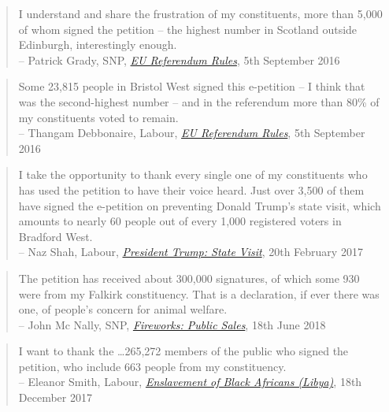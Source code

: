 \documentclass[12pt]{article}
\begin{document}
\begin{quote}
I understand and share the frustration of my constituents, more than 5,000 of whom signed the petition -- the highest number in Scotland outside Edinburgh, interestingly enough. \\ 
-- Patrick Grady, SNP, \href{https://hansard.parliament.uk/commons/2016-09-05/debates/D2FA95BF-6E07-497D-83A4-0B7341384289/EUReferendumRules}{\emph{EU Referendum Rules}}, 5th September 2016
\end{quote}

\begin{quote}
Some 23,815 people in Bristol West signed this e-petition -- I think that was the second-highest number -- and in the referendum more than 80\% of my constituents voted to remain. \\ 
-- Thangam Debbonaire, Labour, \href{https://hansard.parliament.uk/commons/2016-09-05/debates/D2FA95BF-6E07-497D-83A4-0B7341384289/EUReferendumRules}{\emph{EU Referendum Rules}}, 5th September 2016
\end{quote}

\begin{quote}
I take the opportunity to thank every single one of my constituents who has used the petition to have their voice heard. Just over 3,500 of them have signed the e-petition on preventing Donald Trump's state visit, which amounts to nearly 60 people out of every 1,000 registered voters in Bradford West.\\ 
-- Naz Shah, Labour, \href{https://hansard.parliament.uk/commons/2017-02-20/debates/34847E5C-8B14-46E6-8251-AE99526CC011/PresidentTrumpStateVisit}{\emph{President Trump: State Visit}}, 20th February 2017
\end{quote}


\begin{quote}
The petition has received about 300,000 signatures, of which some 930 were from my Falkirk constituency. That is a declaration, if ever there was one, of people's concern for animal welfare. \\ 
-- John Mc Nally, SNP, \href{https://hansard.parliament.uk/commons/2018-11-26/debates/C95047CD-F24E-44DA-BE73-FC571B014CEF/FireworksPublicSales}{\emph{Fireworks: Public Sales}}, 18th June 2018
\end{quote}


\begin{quote}
I want to thank the \ldots 265,272 members of the public who signed the petition, who include 663 people from my constituency. \\ 
-- Eleanor Smith, Labour, \href{https://hansard.parliament.uk/commons/2017-12-18/debates/D4D9004C-0D4E-4DAD-8C98-309E2C42D2E1/EnslavementOfBlackAfricans(Libya)}{\emph{Enslavement of Black Africans (Libya)}}, 18th December 2017
\end{quote}
\end{document}
